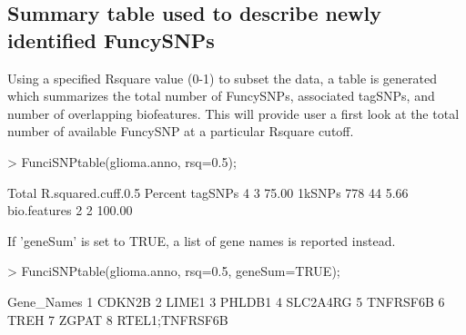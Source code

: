 \documentclass[a4paper]{article}
\begin{document}
\subsection*{Summary table used to describe newly identified FuncySNPs}
Using a specified Rsquare value (0-1) to subset the data, a table is generated 
which summarizes the total number of FuncySNPs, associated tagSNPs, and number
 of overlapping biofeatures. This will provide user a first look at the total 
 number of available FuncySNP at a particular Rsquare cutoff.
\begin{Schunk}
\begin{Sinput}
> FunciSNPtable(glioma.anno, rsq=0.5);
\end{Sinput}
\begin{Soutput}
             Total R.squared.cuff.0.5 Percent
tagSNPs          4                  3   75.00
1kSNPs         778                 44    5.66
bio.features     2                  2  100.00
\end{Soutput}
\end{Schunk}
If 'geneSum' is set to TRUE, a list of gene names is reported instead.
\begin{Schunk}
\begin{Sinput}
> FunciSNPtable(glioma.anno, rsq=0.5, geneSum=TRUE);
\end{Sinput}
\begin{Soutput}
      Gene_Names
1         CDKN2B
2          LIME1
3         PHLDB1
4       SLC2A4RG
5       TNFRSF6B
6           TREH
7          ZGPAT
8 RTEL1;TNFRSF6B
\end{Soutput}
\end{Schunk}
\end{document}
